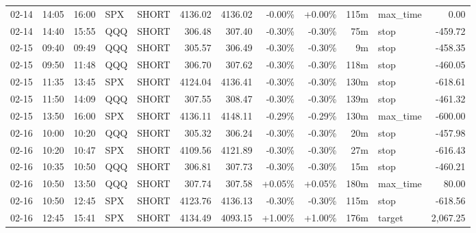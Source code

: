 \documentclass[11pt,a4paper,twoside]{article}
\begin{document}
\begin{center}
\begin{longtable}{>{\color{txtmain}}l l l l l r r r r r >{\color{txtmain}}l r}
02-14 & 14:05 & 16:00 & SPX & SHORT & 4136.02 & 4136.02 & \textcolor{wingreen}{-0.00\%} & \textcolor{wingreen}{+0.00\%} & 115m & max\_time & \textcolor{wingreen}{0.00} \\
02-14 & 14:40 & 15:55 & QQQ & SHORT & 306.48 & 307.40 & \textcolor{lossred}{-0.30\%} & \textcolor{lossred}{-0.30\%} & 75m & stop & \textcolor{lossred}{-459.72} \\
02-15 & 09:40 & 09:49 & QQQ & SHORT & 305.57 & 306.49 & \textcolor{lossred}{-0.30\%} & \textcolor{lossred}{-0.30\%} & 9m & stop & \textcolor{lossred}{-458.35} \\
02-15 & 09:50 & 11:48 & QQQ & SHORT & 306.70 & 307.62 & \textcolor{lossred}{-0.30\%} & \textcolor{lossred}{-0.30\%} & 118m & stop & \textcolor{lossred}{-460.05} \\
02-15 & 11:35 & 13:45 & SPX & SHORT & 4124.04 & 4136.41 & \textcolor{lossred}{-0.30\%} & \textcolor{lossred}{-0.30\%} & 130m & stop & \textcolor{lossred}{-618.61} \\
02-15 & 11:50 & 14:09 & QQQ & SHORT & 307.55 & 308.47 & \textcolor{lossred}{-0.30\%} & \textcolor{lossred}{-0.30\%} & 139m & stop & \textcolor{lossred}{-461.32} \\
02-15 & 13:50 & 16:00 & SPX & SHORT & 4136.11 & 4148.11 & \textcolor{lossred}{-0.29\%} & \textcolor{lossred}{-0.29\%} & 130m & max\_time & \textcolor{lossred}{-600.00} \\
02-16 & 10:00 & 10:20 & QQQ & SHORT & 305.32 & 306.24 & \textcolor{lossred}{-0.30\%} & \textcolor{lossred}{-0.30\%} & 20m & stop & \textcolor{lossred}{-457.98} \\
02-16 & 10:20 & 10:47 & SPX & SHORT & 4109.56 & 4121.89 & \textcolor{lossred}{-0.30\%} & \textcolor{lossred}{-0.30\%} & 27m & stop & \textcolor{lossred}{-616.43} \\
02-16 & 10:35 & 10:50 & QQQ & SHORT & 306.81 & 307.73 & \textcolor{lossred}{-0.30\%} & \textcolor{lossred}{-0.30\%} & 15m & stop & \textcolor{lossred}{-460.21} \\
02-16 & 10:50 & 13:50 & QQQ & SHORT & 307.74 & 307.58 & \textcolor{wingreen}{+0.05\%} & \textcolor{wingreen}{+0.05\%} & 180m & max\_time & \textcolor{wingreen}{80.00} \\
02-16 & 10:50 & 12:45 & SPX & SHORT & 4123.76 & 4136.13 & \textcolor{lossred}{-0.30\%} & \textcolor{lossred}{-0.30\%} & 115m & stop & \textcolor{lossred}{-618.56} \\
02-16 & 12:45 & 15:41 & SPX & SHORT & 4134.49 & 4093.15 & \textcolor{wingreen}{+1.00\%} & \textcolor{wingreen}{+1.00\%} & 176m & target & \textcolor{wingreen}{2,067.25} \\

\end{longtable}
\end{center}
\end{document}
